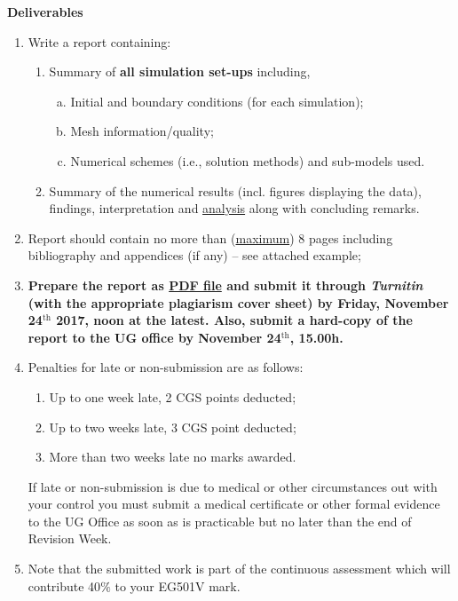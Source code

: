 \documentclass[12pts,a4paper,amsmath,amssymb,floatfix]{article}%
\begin{document}
\clearpage
\begin{center}
\Large{\bf Deliverables}
\end{center}
\begin{enumerate}[1)]
  \item Write a report containing:
  \begin{enumerate}
    \item Summary of {\bf all simulation set-ups} including,
       \begin{enumerate} [(a)]
          \item Initial and boundary conditions (for each simulation);
          \item Mesh information/quality;
          \item Numerical schemes (i.e., solution methods) and sub-models used.
       \end{enumerate}
    \item Summary of the numerical results (incl. figures displaying the data), findings, interpretation and \underline{analysis} along with concluding remarks.
  \end{enumerate}
  
  \item Report should contain no more than (\underline{maximum}) 8 pages including bibliography and appendices (if any) -- see attached example;

\item {\bf Prepare the report as \underline{PDF file} and submit it through {\it Turnitin} (with the appropriate plagiarism cover sheet) by Friday, November 24$^{\text{th}}$ 2017, noon at the latest. Also, submit a hard-copy of the report to the UG office by November 24$^{\text{th}}$, 15.00h.}
%
%
\item Penalties for late or non-submission are as follows:
\begin{enumerate}%
  \item Up to one week late, 2 CGS points deducted;
  \item Up to two weeks late, 3 CGS point deducted;
  \item More than two weeks late no marks awarded.
\end{enumerate}
If late or non-submission is due to medical or other circumstances out with your control you must submit a medical certificate or other formal evidence to the UG Office as soon as is practicable but no later than the end of Revision Week.

\item Note that the submitted work is part of the continuous assessment which will contribute 40$\%$ to your EG501V mark.

\end{enumerate}
\end{document}
